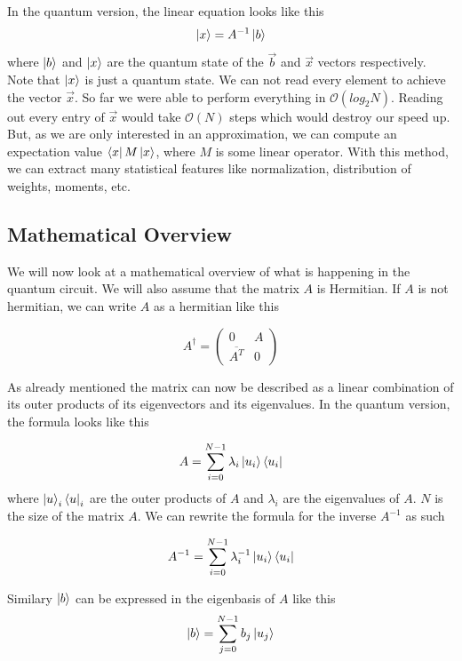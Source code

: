 In the quantum version, the linear equation looks like this
\begin{equation}
\ket{x} = A^{-1}\ket{b}
\end{equation}
where $\ket b$ and $\ket x$ are the quantum state of the $\vec b$ and $\vec x$ vectors respectively.
Note that  $\ket x$ is just a quantum state. 
We can not read every element to achieve the vector $\vec x$. 
So far we were able to perform everything in $\mathcal{O}(log_2 N)$.
Reading out every entry of $\vec x$ would take $\mathcal{O} (N)$ steps which would destroy our speed up.
But, as we are only interested in an approximation, we can compute an expectation value $\bra x M \ket x$, where $M$ is some linear operator. 
With this method, we can extract many statistical features like normalization, distribution of weights, moments, etc.



\subsection{Mathematical Overview}
We will now look at a mathematical overview of what is happening in the quantum circuit.
We will also assume that the matrix $A$ is Hermitian. If $A$ is not hermitian, we can write $A$ as a hermitian like this

\begin{equation}
A^\dagger = \begin{pmatrix} 0 & A \\ \overline{A^T}& 0 \end{pmatrix}
\end{equation}

As already mentioned the matrix can now be described as a linear combination of its outer products of its eigenvectors and its eigenvalues.
In the quantum version, the formula looks like this

\begin{equation}
A = \sum_{i=0}^{N-1} \lambda_i \ket{u_i}\bra{u_i}
\end{equation}
where $\ket u_i  \bra u_i$ are the outer products of $A$ and $\lambda_i$ are the eigenvalues of $A$. 
$N$ is the size of the matrix $A$.
We can rewrite the formula for the inverse $A^{-1}$ as such

\begin{equation}
A^{-1} = \sum_{i=0}^{N-1} \lambda_i^{-1} \ket{u_i}\bra{u_i}
\end{equation}

Similary $\ket b$ can be expressed in the eigenbasis of $A$ like this
\begin{equation}
\ket{b} = \sum_{j=0}^{N-1} b_j\ket{u_j}
\end{equation}

